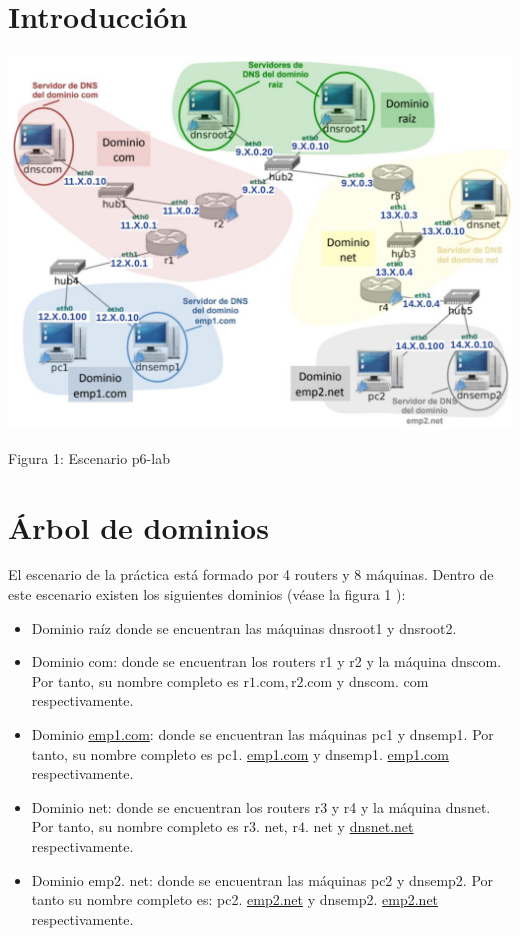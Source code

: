 \documentclass[12pt, a4paper]{report}
\begin{document}
\chapter{Introducción}
\begin{center}
\includegraphics[max width=\textwidth]{2022_12_15_5d692d3f6b88770a0becg-1}
\end{center}

Figura 1: Escenario p6-lab

\chapter{Árbol de dominios}
El escenario de la práctica está formado por 4 routers y 8 máquinas. Dentro de este escenario existen los siguientes dominios (véase la figura 1 ):

\begin{itemize}
  \item Dominio raíz donde se encuentran las máquinas dnsroot1 y dnsroot2.

  \item Dominio com: donde se encuentran los routers r1 y r2 y la máquina dnscom. Por tanto, su nombre completo es $\mathrm{r} 1 . \mathrm{com}, \mathrm{r} 2 . \mathrm{com}$ y dnscom. com respectivamente.

  \item Dominio \href{http://emp1.com}{emp1.com}: donde se encuentran las máquinas pc1 y dnsemp1. Por tanto, su nombre completo es pc1. \href{http://emp1.com}{emp1.com} y dnsemp1. \href{http://emp1.com}{emp1.com} respectivamente.

  \item Dominio net: donde se encuentran los routers r3 y r4 y la máquina dnsnet. Por tanto, su nombre completo es $\mathrm{r} 3$. net, $\mathrm{r} 4$. net y \href{http://dnsnet.net}{dnsnet.net} respectivamente.

  \item Dominio emp2. net: donde se encuentran las máquinas pc2 y dnsemp2. Por tanto su nombre completo es: pc2. \href{http://emp2.net}{emp2.net} y dnsemp2. \href{http://emp2.net}{emp2.net} respectivamente.

\end{itemize}
\end{document}
